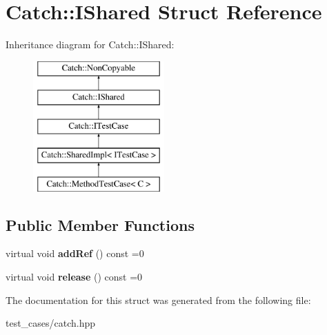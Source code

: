 \hypertarget{structCatch_1_1IShared}{}\section{Catch\+:\+:I\+Shared Struct Reference}
\label{structCatch_1_1IShared}
Inheritance diagram for Catch\+:\+:I\+Shared\+:\begin{figure}[H]
\begin{center}
\leavevmode
\includegraphics[height=5.000000cm]{structCatch_1_1IShared}
\end{center}
\end{figure}
\subsection*{Public Member Functions}
\begin{DoxyCompactItemize}
\item 
\mbox{\label{structCatch_1_1IShared_ae383df68557cdaf0910b411af04d9e33}} 
virtual void {\bfseries add\+Ref} () const =0
\item 
\mbox{\label{structCatch_1_1IShared_a002f52624728a763956fb6f230cb2f57}} 
virtual void {\bfseries release} () const =0
\end{DoxyCompactItemize}


The documentation for this struct was generated from the following file\+:\begin{DoxyCompactItemize}
\item 
test\+\_\+cases/catch.\+hpp\end{DoxyCompactItemize}

